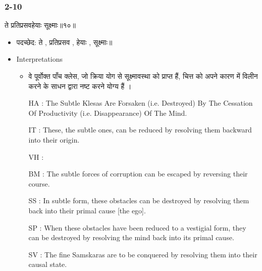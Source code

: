 \begin{frame}[fragile]\frametitle{2-10}
\begin{sanskrit}
ते प्रतिप्रसवहेयाः सूक्ष्माः॥१०॥
\end{sanskrit}

	\begin{itemize}
	\item पदच्छेद: ते , प्रतिप्रसव , हेयाः , सूक्ष्माः॥
	\item Interpretations
		\begin{itemize}
		\item वे पूर्वोक्त पाँच क्लेस, जो क्रिया योग से सूक्ष्मावस्था को प्राप्त हैं, चित्त को अपने कारण में विलीन करने के साधन द्वारा नष्ट करने योग्य हैं ।
		\item [HA]: The Subtle Klesas Are Forsaken (i.e. Destroyed) By The Cessation Of Productivity (i.e. Disappearance) Of The Mind.
		\item [IT]: These, the subtle ones, can be reduced by resolving them backward into their origin.
		\item [VH]: 
		\item [BM]: The subtle forces of corruption can be escaped by reversing their course.
		\item [SS]: In subtle form, these obstacles can be destroyed by resolving them back into their primal cause [the ego].
		\item [SP]: When these obstacles have been reduced to a vestigial form, they can be destroyed by resolving the mind back into its primal cause.
		\item [SV]: The fine Samskaras are to be conquered by resolving them into their causal state. 
		\end{itemize}
	\end{itemize}
	
\end{frame}



